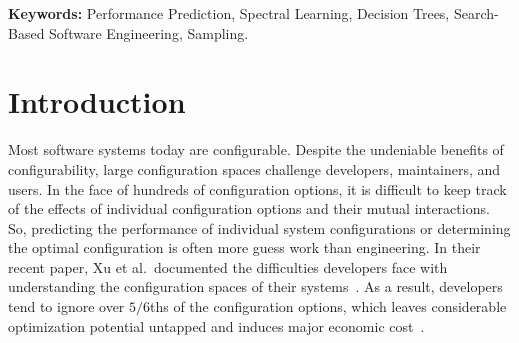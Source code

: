 \documentclass{newsig}
\begin{document}
 
\vspace{1ex}
\noindent
{\bf Keywords:} Performance Prediction, 
Spectral Learning, 
Decision Trees,
Search-Based Software Engineering, 
Sampling.
 

 
\section{Introduction}
 

Most software systems today are configurable. Despite the undeniable benefits
of configurability, 
large configuration spaces challenge developers, maintainers, and users. In the face of hundreds of configuration options, it is difficult to keep track of the effects of individual configuration options and their mutual interactions. So, predicting the performance of individual system configurations or determining the optimal configuration is often more guess work than engineering. In their recent paper, Xu et al.\ documented the  difficulties developers face
with understanding  the configuration spaces of their systems~\cite{xu2015hey}. As a result, developers tend to ignore over $5/6$ths of the configuration options, which leaves considerable optimization potential untapped and induces major economic cost~\cite{xu2015hey}.
\end{document}
